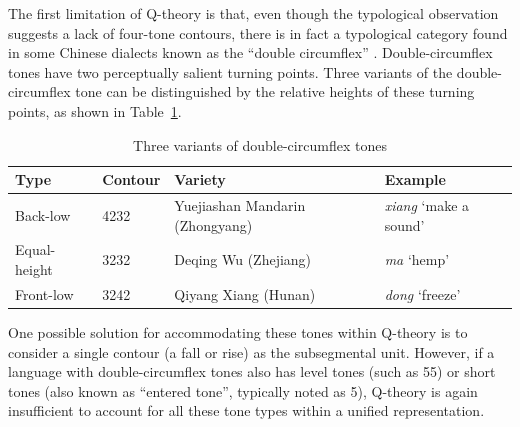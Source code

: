 		

The first limitation of Q-theory is that, even though the typological observation
suggests a lack of four-tone contours, there is in fact a typological category
found in some Chinese dialects known as the ``double circumflex''
\citep{zhu2012dipping}. Double-circumflex tones have two perceptually salient turning
points. Three variants of the double-circumflex tone can be distinguished by the
relative heights of these turning points, as shown in
Table~\ref{tab:double-circumflex}.

\begin{table}[htbp]
	\centering
	\caption{Three variants of double-circumflex tones}
	\label{tab:double-circumflex}
	\begin{tabular}{llll}
		\hline
		\textbf{Type} & \textbf{Contour} & \textbf{Variety} & \textbf{Example} \\
		\hline
		Back-low     & 4232 & Yuejiashan Mandarin (Zhongyang)
		& \textit{xiang} `make a sound' \\
		Equal-height & 3232 & Deqing Wu (Zhejiang)
		& \textit{ma} `hemp' \\
		Front-low    & 3242 & Qiyang Xiang (Hunan)
		& \textit{dong} `freeze' \\
		\hline
	\end{tabular}
\end{table}

One possible solution for accommodating these tones within Q-theory is to
consider a single contour (a fall or rise) as the subsegmental unit.
However, if a language with double-circumflex tones also has level tones (such
as 55) or short tones (also known as ``entered tone'', typically noted as 5), Q-theory is again insufficient to account
for all these tone types within a unified representation.

